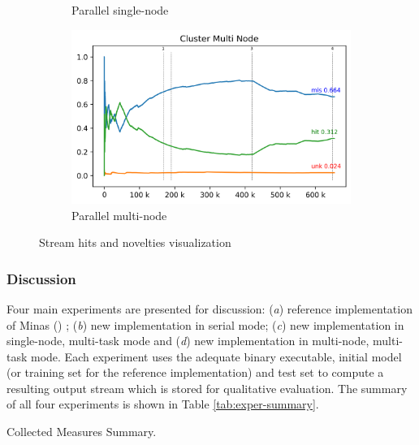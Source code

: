\begin{figure}[hbt]
\begin{subfigure}{.5\linewidth}
      \caption{Parallel single-node}
      \label{fig:cluster-sub-single}
    \end{subfigure}
    \begin{subfigure}{.5\linewidth}
      \centering
      \includegraphics[width=\linewidth]{experiments/tmi-n12.log.png}
      \caption{Parallel multi-node}
      \label{fig:cluster-sub-multi}
    \end{subfigure}
  \caption{Stream hits and novelties visualization}
  \label{fig:visualization}
\end{figure}

\subsubsection{Discussion}

Four main experiments are presented for discussion:
(\emph{a}) reference implementation of Minas () \cite{Faria2015minas};
(\emph{b}) new implementation in serial mode;
(\emph{c}) new implementation in single-node, multi-task mode and
(\emph{d}) new implementation in multi-node, multi-task mode.
Each experiment uses the adequate binary executable, initial model
(or training set for the reference implementation) and test set
to compute a resulting output stream which is stored for qualitative evaluation.
The summary of all four experiments is shown in Table \ref{tab:exper-summary}.

\begin{table}[hbt]
\begin{center}
  \caption{Collected Measures Summary.}
  \label{tab:exper-summary}
  
\end{center}
\end{table}

